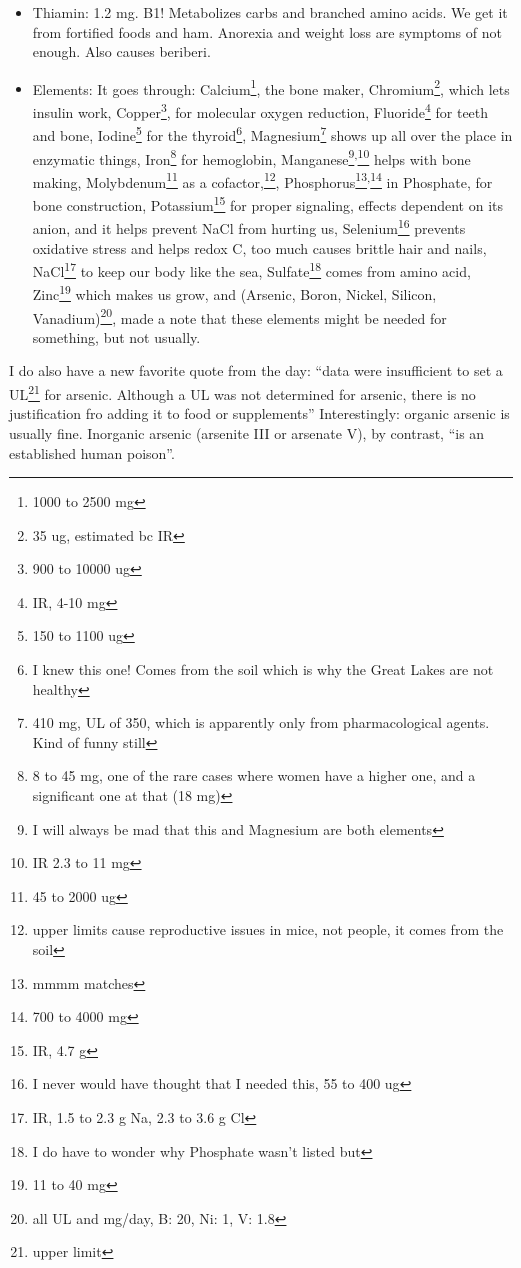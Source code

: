 \documentclass[12pt]{article}[titlepage]
\newcommand{\say}[1]{``#1''}
\renewcommand{\,}{\textsuperscript{,}}
\begin{document}
\begin{itemize}
\begin{itemize}
General malaise symptoms\footnote{commentary} are deficiency signs.  
\item Thiamin: 1.2 mg. B1! Metabolizes carbs and branched amino acids. We get it from fortified foods and ham. Anorexia and weight loss are symptoms of not enough. Also causes beriberi.  
\item Elements: It goes through: Calcium\footnote{1000 to 2500 mg}, the bone maker, Chromium\footnote{35 ug, estimated bc IR}, which lets insulin work, Copper\footnote{900 to 10000 ug}, for molecular oxygen reduction, Fluoride\footnote{IR, 4-10 mg} for teeth and bone, Iodine\footnote{150 to 1100 ug} for the thyroid\footnote{I knew this one! Comes from the soil which is why the Great Lakes are not healthy}, Magnesium\footnote{410 mg, UL of 350, which is apparently only from pharmacological agents. Kind of funny still} shows up all over the place in enzymatic things, Iron\footnote{8 to 45 mg, one of the rare cases where women have a higher one, and a significant one at that (18 mg)} for hemoglobin, Manganese\footnote{I will always be mad that this and Magnesium are both elements}\textsuperscript{,}\footnote{IR 2.3 to 11 mg} helps with bone making, Molybdenum\footnote{45 to 2000 ug} as a cofactor,\footnote{upper limits cause reproductive issues in mice, not people, it comes from the soil}, Phosphorus\footnote{mmmm matches}\textsuperscript{,}\footnote{700 to 4000 mg} in Phosphate, for bone construction, Potassium\footnote{IR, 4.7 g} for proper signaling, effects dependent on its anion, and it helps prevent NaCl from hurting us, Selenium\footnote{I never would have thought that I needed this, 55 to 400 ug} prevents oxidative stress and helps redox C, too much causes brittle hair and nails, NaCl\footnote{IR, 1.5 to 2.3 g Na, 2.3 to 3.6 g Cl} to keep our body like the sea, Sulfate\footnote{I do have to wonder why Phosphate wasn't listed but} comes from amino acid, Zinc\footnote{11 to 40 mg} which makes us grow, and (Arsenic, Boron, Nickel, Silicon, Vanadium)\footnote{all UL and mg/day, B: 20, Ni: 1, V: 1.8}, made a note that these elements might be needed for something, but not usually.   
\end{itemize}  
\end{itemize}

I do also have a new favorite quote from the day: \say{data were insufficient to set a UL\footnote{upper limit} for arsenic. Although a UL was not determined for arsenic, there is no justification fro adding it to food or supplements}  
Interestingly: organic arsenic is usually fine. Inorganic arsenic (arsenite III or arsenate V), by contrast, \say{is an established human poison}.
\end{document}
